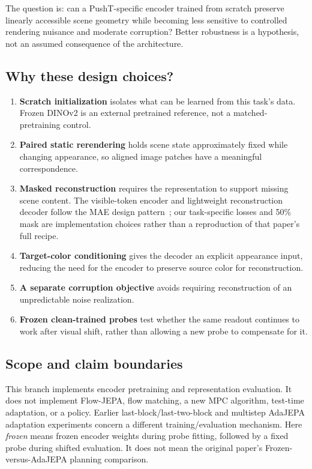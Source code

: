 \documentclass[11pt,a4paper]{article}
\begin{document}
The question is: can a PushT-specific encoder trained from scratch preserve
linearly accessible scene geometry while becoming less sensitive to controlled
rendering nuisance and moderate corruption? Better robustness is a hypothesis,
not an assumed consequence of the architecture.

\subsection{Why these design choices?}
\begin{enumerate}
\item \textbf{Scratch initialization} isolates what can be learned from this task's
data. Frozen DINOv2 is an external pretrained reference, not a matched-pretraining control.
\item \textbf{Paired static rerendering} holds scene state approximately fixed while
changing appearance, so aligned image patches have a meaningful correspondence.
\item \textbf{Masked reconstruction} requires the representation to support missing
scene content. The visible-token encoder and lightweight reconstruction decoder
follow the MAE design pattern~\cite{mae}; our task-specific losses and 50\% mask are
implementation choices rather than a reproduction of that paper's full recipe.
\item \textbf{Target-color conditioning} gives the decoder an explicit appearance
input, reducing the need for the encoder to preserve source color for reconstruction.
\item \textbf{A separate corruption objective} avoids requiring reconstruction of
an unpredictable noise realization.
\item \textbf{Frozen clean-trained probes} test whether the same readout continues
to work after visual shift, rather than allowing a new probe to compensate for it.
\end{enumerate}

\subsection{Scope and claim boundaries}
This branch implements encoder pretraining and representation evaluation.
It does not implement Flow-JEPA, flow matching, a new MPC algorithm, test-time
adaptation, or a policy. Earlier last-block/last-two-block and multistep AdaJEPA
adaptation experiments concern a different training/evaluation mechanism.
Here \emph{frozen} means frozen encoder weights during probe fitting, followed by
a fixed probe during shifted evaluation. It does not mean the original paper's
Frozen-versus-AdaJEPA planning comparison.
\end{document}
